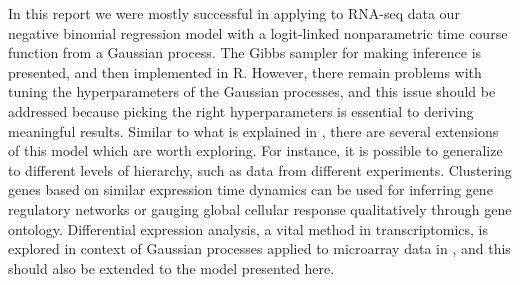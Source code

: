 \documentclass[11pt]{article}
\newcommand{\1}{\mathbf{1}}
\newcommand{\0}{\mathbf{0}}
\begin{document}
In this report we were mostly successful in applying to RNA-seq data our negative binomial regression model with a logit-linked nonparametric time course function from a Gaussian process. The Gibbs sampler for making inference is presented, and then implemented in \textsf{R}. However, there remain problems with tuning the hyperparameters of the Gaussian processes, and this issue should be addressed because picking the right hyperparameters is essential to deriving meaningful results. Similar to what is explained in \cite{GPmicroarray}, there are several extensions of this model which are worth exploring. For instance, it is possible to generalize to different levels of hierarchy, such as data from different experiments. Clustering genes based on similar expression time dynamics can be used for inferring gene regulatory networks or gauging global cellular response qualitatively through gene ontology. Differential expression analysis, a vital method in transcriptomics, is explored in context of Gaussian processes applied to microarray data in \cite{GPDE}, and this should also be extended to the model presented here.








{}

% 
% 














\appendix

\end{document}
